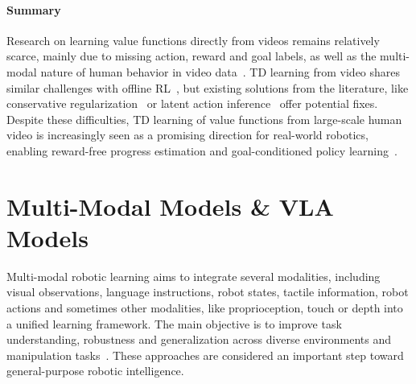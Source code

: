 \paragraph{Summary}
Research on learning value functions directly from videos remains relatively scarce, mainly due to missing action, reward and goal labels, as well as the multi-modal nature of human behavior in video data~\cite{McCarthy_2025}. \ac{TD} learning from video shares similar challenges with offline \ac{RL}~\cite{Levine2020OfflineRL}, but existing solutions from the literature, like conservative regularization~\cite{Kumar2020ConservativeQF} or latent action inference~\cite{Zhou2020PLASLA} offer potential fixes. Despite these difficulties, \ac{TD} learning of value functions from large-scale human video is increasingly seen as a promising direction for real-world robotics, enabling reward-free progress estimation and goal-conditioned policy learning~\cite{Bhateja2023RoboticOR}.






\section{Multi-Modal Models \& \acs{VLA} Models}
\label{sec:MultiModalApproachesVLAModels}

Multi-modal robotic learning aims to integrate several modalities, including visual observations, language instructions, robot states, tactile information, robot actions and sometimes other modalities, like proprioception, touch or depth into a unified learning framework. The main objective is to improve task understanding, robustness and generalization across diverse environments and manipulation tasks~\cite{rt12022arxiv, rt22023arxiv}. These approaches are considered an important step toward general-purpose robotic intelligence.


